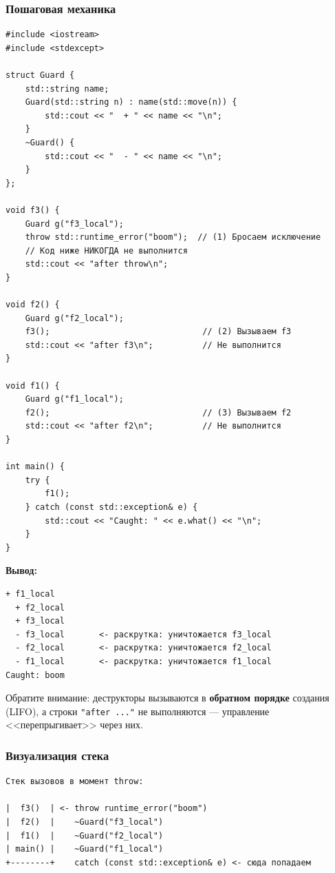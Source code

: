 \documentclass[a4paper,12pt]{article}
\begin{document}
\subsubsection{Пошаговая механика}

\begin{lstlisting}
#include <iostream>
#include <stdexcept>

struct Guard {
    std::string name;
    Guard(std::string n) : name(std::move(n)) {
        std::cout << "  + " << name << "\n";
    }
    ~Guard() {
        std::cout << "  - " << name << "\n";
    }
};

void f3() {
    Guard g("f3_local");
    throw std::runtime_error("boom");  // (1) Бросаем исключение
    // Код ниже НИКОГДА не выполнится
    std::cout << "after throw\n";
}

void f2() {
    Guard g("f2_local");
    f3();                               // (2) Вызываем f3
    std::cout << "after f3\n";          // Не выполнится
}

void f1() {
    Guard g("f1_local");
    f2();                               // (3) Вызываем f2
    std::cout << "after f2\n";          // Не выполнится
}

int main() {
    try {
        f1();
    } catch (const std::exception& e) {
        std::cout << "Caught: " << e.what() << "\n";
    }
}
\end{lstlisting}

\textbf{Вывод:}
\begin{lstlisting}[numbers=none]
  + f1_local
  + f2_local
  + f3_local
  - f3_local       <- раскрутка: уничтожается f3_local
  - f2_local       <- раскрутка: уничтожается f2_local
  - f1_local       <- раскрутка: уничтожается f1_local
Caught: boom
\end{lstlisting}

Обратите внимание: деструкторы вызываются в \textbf{обратном порядке} создания
(LIFO), а строки \texttt{"after ..."} не выполняются --- управление <<перепрыгивает>>
через них.

\subsubsection{Визуализация стека}

\begin{lstlisting}[numbers=none]
Стек вызовов в момент throw:

|  f3()  | <- throw runtime_error("boom")
|  f2()  |    ~Guard("f3_local")
|  f1()  |    ~Guard("f2_local")
| main() |    ~Guard("f1_local")
+--------+    catch (const std::exception& e) <- сюда попадаем
\end{lstlisting}
\end{document}
